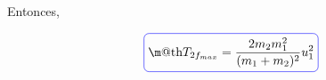 \documentclass[a4paper,10pt]{article}
\makeatletter
\numberwithin{equation}{section}
\newcommand*{\boxcolor}{blue}
\renewcommand{\boxed}[1]{\textcolor{\boxcolor}{%
\tikz[baseline={([yshift=-1ex]current bounding box.center)}] \node [rectangle, minimum width=1ex,rounded corners,draw] {\normalcolor\m@th$\displaystyle#1$};}}
\makeatother
\begin{document}
Entonces,

\begin{equation}
 \boxed{T_{2f_{max}} = \frac{2 m_2 m_1^2}{(m_1 + m_2)^2} u_1^2}
\end{equation}


% 
% 
% 
% 
% 
% 
% 
%   
% 
% 
% 
\end{document}
